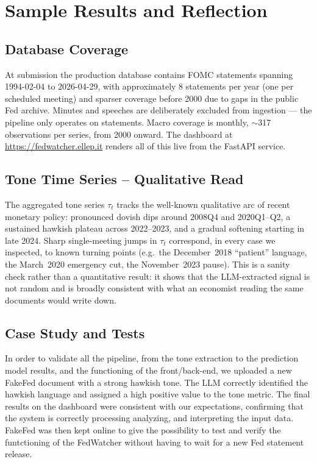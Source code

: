 \section{Sample Results and Reflection}

\subsection{Database Coverage}
At submission the production database contains FOMC statements spanning 1994-02-04 to 2026-04-29, with approximately 8 statements per year (one per scheduled meeting) and sparser coverage before 2000 due to gaps in the public Fed archive. Minutes and speeches are deliberately excluded from ingestion --- the pipeline only operates on statements. Macro coverage is monthly, $\sim$317 observations per series, from 2000 onward. The dashboard at \url{https://fedwatcher.ellep.it} renders all of this live from the FastAPI service.

\subsection{Tone Time Series -- Qualitative Read}
The aggregated tone series $\tau_t$ tracks the well-known qualitative arc of recent monetary policy: pronounced dovish dips around 2008Q4 and 2020Q1--Q2, a sustained hawkish plateau across 2022--2023, and a gradual softening starting in late 2024. Sharp single-meeting jumps in $\tau_t$ correspond, in every case we inspected, to known turning points (e.g.\ the December~2018 ``patient'' language, the March~2020 emergency cut, the November~2023 pause). This is a sanity check rather than a quantitative result: it shows that the LLM-extracted signal is not random and is broadly consistent with what an economist reading the same documents would write down.

\subsection{Case Study and Tests}
In order to validate all the pipeline, from the tone extraction to the prediction model results, and the functioning of the front/back-end, we uploaded a new FakeFed document with a strong hawkish tone. The LLM correctly identified the hawkish language and assigned a high positive value to the tone metric. The final results on the dashboard were consistent with our expectations, confirming that the system is correctly processing analyzing, and interpreting the input data. FakeFed was then kept online to give the possibility to test and verify the funtctioning of the FedWatcher without having to wait for a new Fed statement release. 

